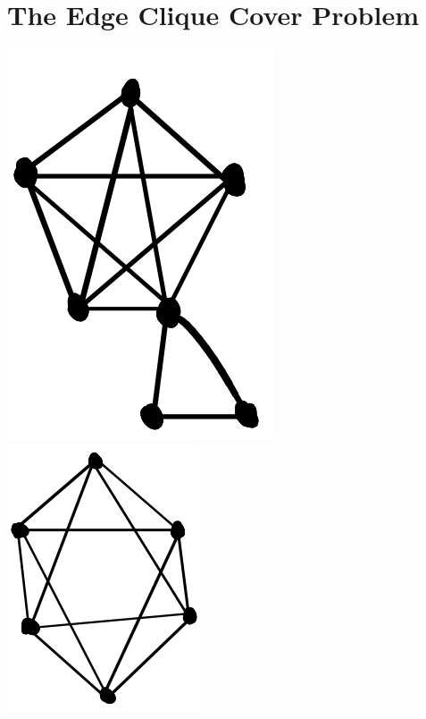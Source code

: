 \documentclass[12pt]{article}
\begin{document}
\section*{The Edge Clique Cover Problem}
    \begin{center}\includegraphics[scale=1]{fig11.png} \hspace{3in} \includegraphics[scale=1.4]{fig12.png} \end{center}


\end{document}
